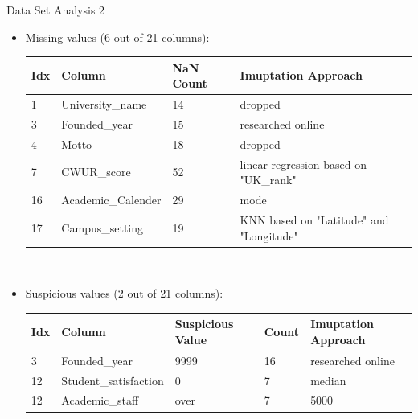 \documentclass[xcolor=table]{beamer} %
\begin{document}
\begin{frame}{Data Set Analysis 2}
  \vspace{-1cm}
  \begin{itemize}
  \item Missing values (6 out of 21 columns):
    \begin{table}[h]
      \centering
      \tiny
      \begin{tabular}{l|l|l|l}
        Idx & Column             & NaN Count & Imuptation Approach \\
        \hline
        1   & University\_name   & 14        & dropped \\
        3   & Founded\_year      & 15        & researched online \\
        4   & Motto              & 18        & dropped \\
        7   & CWUR\_score        & 52        & linear regression based on "UK\_rank" \\
        16  & Academic\_Calender & 29        & mode \\
        17  & Campus\_setting    & 19        & KNN based on "Latitude" and "Longitude"
      \end{tabular}\hfill\
      \label{tab:missing_values_nan}
    \end{table}
  \item Suspicious values (2 out of 21 columns):
    \begin{table}[h]
      \centering
      \tiny
      \begin{tabular}{l|l|l|l|l}
        Idx & Column                & Suspicious Value & Count & Imuptation Approach \\
        \hline
        3   & Founded\_year         & 9999             & 16    & researched online \\
        12  & Student\_satisfaction & 0                & 7     & median \\
        12  & Academic\_staff       & over             & 7     & 5000 \\
      \end{tabular}\hfill\
      \label{tab:missing_values_zero}
    \end{table}
  \end{itemize}
\end{frame}
\end{document}
